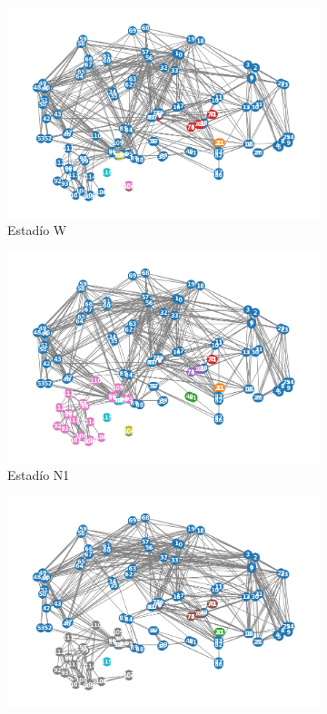 \documentclass{article}
\begin{document}
\begin{figure}[!htb]
	\centering
	\begin{subfigure}[b]{0.45\textwidth}
		\includegraphics[width= \textwidth]{fg/modulos_W_GN.png}
        \caption{Estadío W}
		\label{modulos_W_GN}
	\end{subfigure}
	\begin{subfigure}[b]{0.45\textwidth}
		\includegraphics[width= \textwidth]{fg/modulos_N1_GN.png}
        \caption{Estadío N1}
        \label{modulos_N1_GN}
	\end{subfigure}
 	\begin{subfigure}[b]{0.45\textwidth}
		\includegraphics[width= \textwidth]{fg/modulos_N2_GN.png}

\end{subfigure}
\end{figure}
\end{document}
